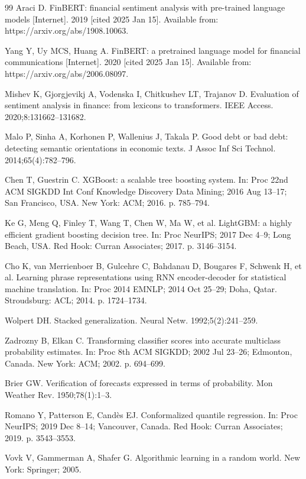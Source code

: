 \documentclass[12pt,a4paper]{article}
\begin{document}
\begin{singlespace}
\begin{thebibliography}{99}
Araci D. FinBERT: financial sentiment analysis with pre-trained language
models [Internet]. 2019 [cited 2025 Jan 15]. Available from:
https://arxiv.org/abs/1908.10063.

Yang Y, Uy MCS, Huang A. FinBERT: a pretrained language model for financial
communications [Internet]. 2020 [cited 2025 Jan 15]. Available from:
https://arxiv.org/abs/2006.08097.

Mishev K, Gjorgjevikj A, Vodenska I, Chitkushev LT, Trajanov D. Evaluation
of sentiment analysis in finance: from lexicons to transformers. IEEE Access.
2020;8:131662--131682.

Malo P, Sinha A, Korhonen P, Wallenius J, Takala P. Good debt or bad debt:
detecting semantic orientations in economic texts. J Assoc Inf Sci Technol.
2014;65(4):782--796.

Chen T, Guestrin C. XGBoost: a scalable tree boosting system. In: Proc 22nd
ACM SIGKDD Int Conf Knowledge Discovery Data Mining; 2016 Aug 13--17; San
Francisco, USA. New York: ACM; 2016. p. 785--794.

Ke G, Meng Q, Finley T, Wang T, Chen W, Ma W, et al. LightGBM: a highly
efficient gradient boosting decision tree. In: Proc NeurIPS; 2017 Dec 4--9;
Long Beach, USA. Red Hook: Curran Associates; 2017. p. 3146--3154.

Cho K, van Merrienboer B, Gulcehre C, Bahdanau D, Bougares F, Schwenk H,
et al. Learning phrase representations using RNN encoder-decoder for
statistical machine translation. In: Proc 2014 EMNLP; 2014 Oct 25--29;
Doha, Qatar. Stroudsburg: ACL; 2014. p. 1724--1734.

Wolpert DH. Stacked generalization. Neural Netw. 1992;5(2):241--259.

Zadrozny B, Elkan C. Transforming classifier scores into accurate multiclass
probability estimates. In: Proc 8th ACM SIGKDD; 2002 Jul 23--26; Edmonton,
Canada. New York: ACM; 2002. p. 694--699.

Brier GW. Verification of forecasts expressed in terms of probability. Mon
Weather Rev. 1950;78(1):1--3.

Romano Y, Patterson E, Cand\`{e}s EJ. Conformalized quantile regression.
In: Proc NeurIPS; 2019 Dec 8--14; Vancouver, Canada. Red Hook: Curran
Associates; 2019. p. 3543--3553.

Vovk V, Gammerman A, Shafer G. Algorithmic learning in a random world.
New York: Springer; 2005.


\end{thebibliography}
\end{singlespace}
\end{document}

